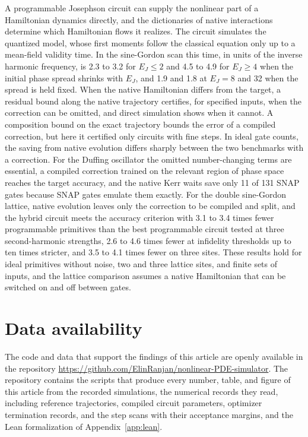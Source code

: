 \documentclass[pra,twocolumn,superscriptaddress,nofootinbib,floatfix]{revtex4-2}
\theoremstyle{remark}
\begin{document}
A programmable Josephson circuit can supply the nonlinear part of a Hamiltonian dynamics directly, and the dictionaries of native interactions determine which Hamiltonian flows it realizes. The circuit simulates the quantized model, whose first moments follow the classical equation only up to a mean-field validity time. In the sine-Gordon scan this time, in units of the inverse harmonic frequency, is 2.3 to 3.2 for \(E_J\le2\) and 4.5 to 4.9 for \(E_J\ge4\) when the initial phase spread shrinks with \(E_J\), and 1.9 and 1.8 at \(E_J=8\) and 32 when the spread is held fixed. When the native Hamiltonian differs from the target, a residual bound along the native trajectory certifies, for specified inputs, when the correction can be omitted, and direct simulation shows when it cannot. A composition bound on the exact trajectory bounds the error of a compiled correction, but here it certified only circuits with fine steps. In ideal gate counts, the saving from native evolution differs sharply between the two benchmarks with a correction. For the Duffing oscillator the omitted number-changing terms are essential, a compiled correction trained on the relevant region of phase space reaches the target accuracy, and the native Kerr waits save only 11 of 131 SNAP gates because SNAP gates emulate them exactly. For the double sine-Gordon lattice, native evolution leaves only the correction to be compiled and split, and the hybrid circuit meets the accuracy criterion with 3.1 to 3.4 times fewer programmable primitives than the best programmable circuit tested at three second-harmonic strengths, 2.6 to 4.6 times fewer at infidelity thresholds up to ten times stricter, and 3.5 to 4.1 times fewer on three sites. These results hold for ideal primitives without noise, two and three lattice sites, and finite sets of inputs, and the lattice comparison assumes a native Hamiltonian that can be switched on and off between gates.

\section*{Data availability}
The code and data that support the findings of this article are openly available in the repository \url{https://github.com/ElinRanjan/nonlinear-PDE-simulator}. The repository contains the scripts that produce every number, table, and figure of this article from the recorded simulations, the numerical records they read, including reference trajectories, compiled circuit parameters, optimizer termination records, and the step scans with their acceptance margins, and the Lean formalization of Appendix~\ref{app:lean}.
\end{document}
